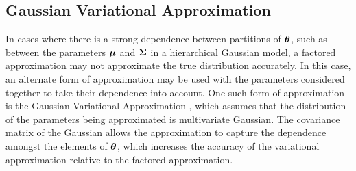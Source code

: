 






\subsection{Gaussian Variational Approximation}

In cases where there is a strong dependence between partitions of ${\boldsymbol \theta}$,  such as between the parameters
${\boldsymbol \mu}$ and ${\boldsymbol \Sigma}$ in a hierarchical Gaussian model, a factored approximation may not approximate the true
distribution accurately. In this case, an alternate form of approximation may be used with the parameters
considered together to take their dependence into account. One such form of approximation is the Gaussian
Variational Approximation \cite{Ormerod2012}, which assumes that the distribution of the parameters being
approximated is multivariate Gaussian. The covariance matrix of the Gaussian allows the approximation to
capture the dependence amongst the elements of ${\boldsymbol \theta}$, which increases the accuracy of the variational
approximation relative to the factored approximation.

